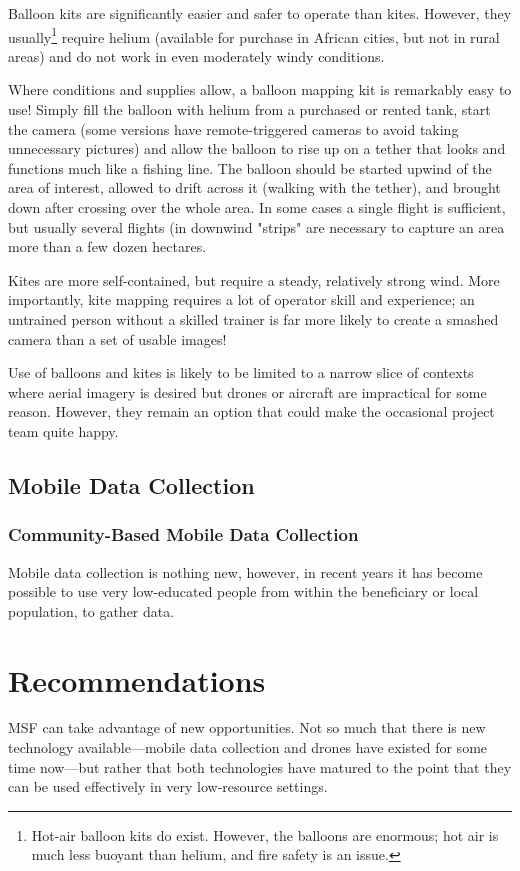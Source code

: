 \documentclass[a4paper,12pt,twoside]{article}
\begin{document}
Balloon kits are significantly easier and safer to operate than kites. However, they usually\footnote{Hot-air balloon kits do exist. However, the balloons are enormous; hot air is much less buoyant than helium, and fire safety is an issue.} require helium (available for purchase in African cities, but not in rural areas) and do not work in even moderately windy conditions. 

Where conditions and supplies allow, a balloon mapping kit is remarkably easy to use! Simply fill the balloon with helium from a purchased or rented tank, start the camera (some versions have remote-triggered cameras to avoid taking unnecessary pictures) and allow the balloon to rise up on a tether that looks and functions much like a fishing line. The balloon should be started upwind of the area of interest, allowed to drift across it (walking with the tether), and brought down after crossing over the whole area. In some cases a single flight is sufficient, but usually several flights (in downwind "strips" are necessary to capture an area more than a few dozen hectares. 

Kites are more self-contained, but require a steady, relatively strong wind. More importantly, kite mapping requires a lot of operator skill and experience; an untrained person without a skilled trainer is far more likely to create a smashed camera than a set of usable images! 

Use of balloons and kites is likely to be limited to a narrow slice of contexts where aerial imagery is desired but drones or aircraft are impractical for some reason. However, they remain an option that could make the occasional project team quite happy.


\subsection{Mobile Data Collection}

\subsubsection{Community-Based Mobile Data Collection}
Mobile data collection is nothing new, however, in recent years it has become possible to use very low-educated people from within the beneficiary or local population, to gather data. 

\section{Recommendations}
MSF can take advantage of new opportunities. Not so much that there is new technology available---mobile data collection and drones have existed for some time now---but rather that both technologies have matured to the point that they can be used effectively in very low-resource settings.
\end{document}

